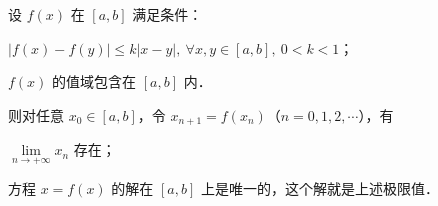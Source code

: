 \begin{xiti}
\begin{ziti}
\end{ziti}
\item 设 $f(x)$ 在 $[a, b]$ 满足条件：
\begin{ziti}
\item $|f(x) - f(y)| \leqslant k |x - y|, \ \forall x, y \in [a, b], \ 0 < k < 1$；
\item $f(x)$ 的值域包含在 $[a, b]$ 内．
\end{ziti}
则对任意 $x_0 \in [a, b]$，令 $x_{n+1} = f(x_n)$（$n = 0, 1, 2, \cdots$），有
\begin{ziti}
\item $\lim\limits_{n \to +\infty} x_n$ 存在；
\item 方程 $x = f(x)$ 的解在 $[a, b]$ 上是唯一的，这个解就是上述极限值．
\end{ziti}
\end{xiti}
